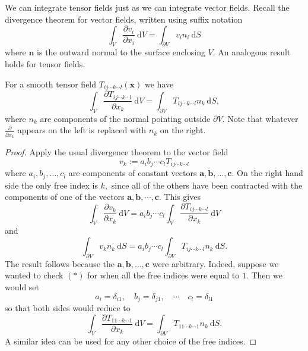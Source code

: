 We can integrate tensor fields just as we can integrate vector fields. Recall the divergence theorem for vector fields, written using suffix notation
\[
\int_{V} \frac{\partial v_{i}}{\partial x_{i}} \mathrm{~d} V=\int_{\partial V} v_{i} n_{i} \mathrm{~d} S
\]
where $\mathbf{n}$ is the outward normal to the surface enclosing $V$. An analogous result holds for
tensor fields.
\begin{proposition}
    For a smooth tensor field $T_{i j \cdots k \cdots l}(\mathbf{x})$ we have
    \[
    \int_{V} \frac{\partial T_{i j \cdots k \cdots l}}{\partial x_{k}} \mathrm{~d} V=\int_{\partial V} T_{i j \cdots k \cdots l} n_{k} \mathrm{~d} S,\tag{$*$}
    \]
    where $ n_k $ are components of the normal pointing outside $ \partial V $. Note that whatever $\frac{\partial}{\partial x_{k}}$ appears on the left is replaced with $n_{k}$ on the right.
\end{proposition}
\begin{proof}
    Apply the usual divergence theorem to the vector field
    \[
    v_{k}:=a_{i} b_{j} \cdots c_{l} T_{i j \cdots k \cdots l}
    \]
    where $a_{i}, b_{j}, \ldots, c_{l}$ are components of constant vectors $\mathbf{a}, \mathbf{b}, \ldots, \mathbf{c} .$ On the right hand side the only free index is $k,$ since all of the others have been contracted with the components of one of the vectors $\mathbf{a}, \mathbf{b}, \cdots, \mathbf{c}$. This gives
    \[
    \int_{V} \frac{\partial v_{k}}{\partial x_{k}} \mathrm{~d} V=a_{i} b_{j} \cdots c_{l} \int_{V} \frac{\partial T_{i j \cdots k \cdots l}}{\partial x_{k}} \mathrm{~d} V
    \]
    and
    \[
    \int_{\partial V} v_{k} n_{k} \mathrm{~d} S=a_{i} b_{j} \cdots c_{l} \int_{\partial V} T_{i j \cdots k \cdots l} n_{k} \mathrm{~d} S .
    \]
    The result follows because the $\mathbf{a}, \mathbf{b}, \ldots, \mathbf{c}$ were arbitrary. Indeed, suppose we wanted to check $(*)$ for when all the free indices were equal to $1 .$ Then we would set
    \[
    a_{i}=\delta_{i 1}, \quad b_{j}=\delta_{j 1}, \quad \cdots \quad c_{l}=\delta_{l 1}
    \]
    so that both sides would reduce to
    \[
    \int_{V} \frac{\partial T_{11 \cdots k \cdots 1}}{\partial x_{k}} \mathrm{~d} V=\int_{\partial V} T_{11 \cdots k \cdots 1} n_{k} \mathrm{~d} S .
    \]
    A similar idea can be used for any other choice of the free indices.
\end{proof}

